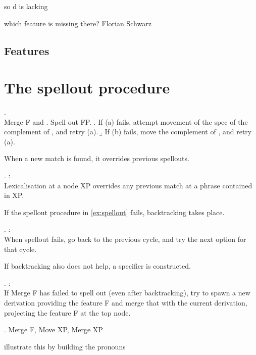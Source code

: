so d is lacking

which feature is missing there? Florian Schwarz


\subsection{Features}




\section{The spellout procedure}

\ex. \\
Merge F and \label{ex:spellout}
 \a. Spell out FP.
 \b. If (a) fails, attempt movement of the spec of the complement of , and retry (a).
 \b. If (b) fails, move the complement of , and retry (a).

When a new match is found, it overrides previous spellouts.

\ex.  \citep{starke2018}:\\
Lexicalisation at a node XP overrides any previous match at a phrase contained in XP.

If the spellout procedure in \ref{ex:spellout} fails, backtracking takes place.

\ex.  \citep{starke2018}:\\
When spellout fails, go back to the previous cycle, and try the next option for that cycle.\label{ex:backtracking}

If backtracking also does not help, a specifier is constructed.

\ex.  \citep{starke2018}:\\
If Merge F has failed to spell out (even after backtracking), try to spawn a new derivation providing the feature F and merge that with the current derivation, projecting the feature F at the top node.\label{ex:specformation}

\ex. Merge F, Move XP, Merge XP


illustrate this by building the pronouns
